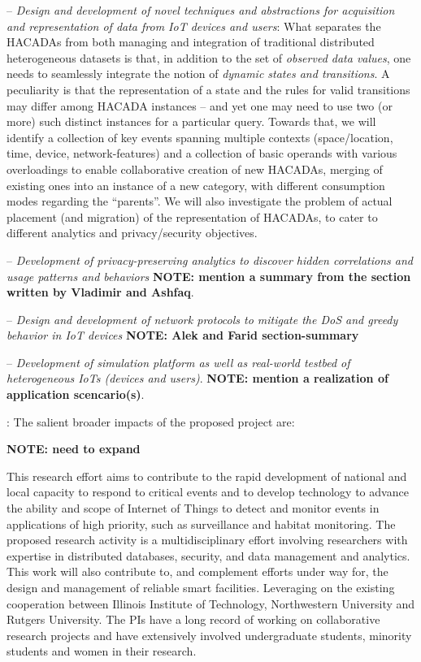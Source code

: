 -- {\it Design and development of novel techniques and abstractions for acquisition and representation of data from IoT devices and users}: What separates the HACADAs from both managing and integration of traditional distributed heterogeneous datasets is that, in addition to the set of {\it observed data values}, one needs to seamlessly integrate the notion of {\it dynamic states and transitions}. A peculiarity is that the representation of a state and the rules for valid transitions may differ among HACADA instances -- and yet one may need to use two (or more) such distinct instances for a particular query. Towards that, we will identify a collection of key events spanning multiple contexts (space/location, time, device, network-features) and a collection of basic operands with various overloadings to enable collaborative creation of new HACADAs, merging of existing ones into an instance of a new category, with different consumption modes regarding the ``parents''. We will also investigate the problem of actual placement (and migration) of the representation of HACADAs, to cater to different analytics and privacy/security objectives. 

-- {\it Development of privacy-preserving analytics to discover hidden correlations and usage patterns and behaviors} {\bf NOTE: mention a summary from the section written by Vladimir and Ashfaq}.

-- {\it Design and development of network protocols to mitigate the DoS and greedy behavior in IoT devices} {\bf NOTE: Alek and Farid section-summary}


-- {\it Development of simulation platform as well as real-world testbed of heterogeneous IoTs (devices and users)}. {\bf NOTE: mention a realization of application scencario(s)}.


: The salient broader impacts of the proposed project are:

{\bf NOTE: need to expand}

This research effort aims to contribute to the rapid development of national and local capacity to respond to critical events and to develop technology to advance the ability and scope of Internet of Things to detect and monitor events in applications of high priority, such as surveillance and habitat monitoring. The proposed research activity is a multidisciplinary effort involving researchers with expertise in distributed databases, security, and data management and analytics. This work will also contribute to, and complement efforts under way for, the design and management of reliable smart facilities. Leveraging on the existing cooperation between Illinois Institute of Technology, Northwestern University and Rutgers University. The PIs have a long record of working on collaborative research projects and have extensively involved undergraduate students, minority students and women in their research.




